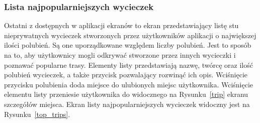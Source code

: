         \subsubsection{Lista najpopularniejszych wycieczek}
        Ostatni z dostępnych w aplikacji ekranów to ekran przedstawiający listę stu nieprywatnych wycieczek stworzonych przez użytkowników aplikacji o największej ilości polubień. 
        Są one uporządkowane względem liczby polubień. Jest to sposób na to, aby użytkownicy mogli odkrywać stworzone przez innych wycieczki i poznawać popularne trasy. Elementy 
        listy przedstawiają nazwę, twórcę oraz ilość polubień wycieczek, a także przycisk pozwalający rozwinąć ich opis. Wciśnięcie przycisku polubienia doda miejsce do ulubionych miejsc
        użytkownika. Wciśnięcie elementu listy przeniesie użytkownika do widocznego na Rysunku~\ref{trip} ekranu szczegółów miejsca. Ekran listy najpopularniejszych wycieczek widoczny jest 
        na Rysunku~\ref{top_trips}.

